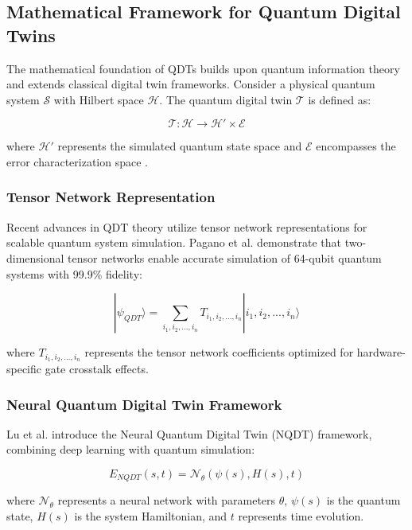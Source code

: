 \subsection{Mathematical Framework for Quantum Digital Twins}

The mathematical foundation of QDTs builds upon quantum information theory and extends classical digital twin frameworks. Consider a physical quantum system $\mathcal{S}$ with Hilbert space $\mathcal{H}$. The quantum digital twin $\mathcal{T}$ is defined as:

\begin{equation}
\mathcal{T}: \mathcal{H} \rightarrow \mathcal{H}' \times \mathcal{E}
\end{equation}

where $\mathcal{H}'$ represents the simulated quantum state space and $\mathcal{E}$ encompasses the error characterization space \cite{huang2024quantum}.

\subsubsection{Tensor Network Representation}

Recent advances in QDT theory utilize tensor network representations for scalable quantum system simulation. Pagano et al. \cite{pagano2024ab} demonstrate that two-dimensional tensor networks enable accurate simulation of 64-qubit quantum systems with 99.9\% fidelity:

\begin{equation}
|\psi_{QDT}\rangle = \sum_{i_1,i_2,...,i_n} T_{i_1,i_2,...,i_n} |i_1,i_2,...,i_n\rangle
\end{equation}

where $T_{i_1,i_2,...,i_n}$ represents the tensor network coefficients optimized for hardware-specific gate crosstalk effects.

\subsubsection{Neural Quantum Digital Twin Framework}

Lu et al. \cite{lu2024neural} introduce the Neural Quantum Digital Twin (NQDT) framework, combining deep learning with quantum simulation:

\begin{equation}
E_{NQDT}(s, t) = \mathcal{N}_{\theta}(\psi(s), H(s), t)
\end{equation}

where $\mathcal{N}_{\theta}$ represents a neural network with parameters $\theta$, $\psi(s)$ is the quantum state, $H(s)$ is the system Hamiltonian, and $t$ represents time evolution.

